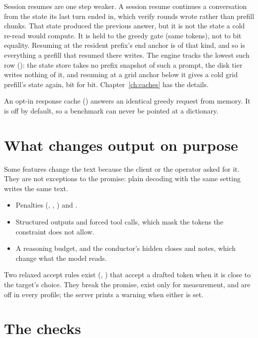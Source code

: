 Session resumes are one step weaker. A session resume continues a conversation from the state its last turn ended in, which verify rounds wrote rather than prefill chunks. That state produced the previous answer, but it is not the state a cold re-read would compute. It is held to the greedy gate (same tokens), not to bit equality. Resuming at the resident prefix's end anchor is of that kind, and so is everything a prefill that resumed there writes. The engine tracks the lowest such row (): the state store takes no prefix snapshot of such a prompt, the disk tier writes nothing of it, and resuming at a grid anchor below it gives a cold grid prefill's state again, bit for bit. Chapter~\ref{ch:caches} has the details.

An opt-in response cache () answers an identical greedy request from memory. It is off by default, so a benchmark can never be pointed at a dictionary.

\section{What changes output on purpose}

Some features change the text because the client or the operator asked for it. They are not exceptions to the promise: plain decoding with the same setting writes the same text.

\begin{itemize}
\item Penalties (, , ) and .
\item Structured outputs and forced tool calls, which mask the tokens the constraint does not allow.
\item A reasoning budget, and the conductor's hidden closes and notes, which change what the model reads.
\end{itemize}

Two relaxed accept rules exist (, ) that accept a drafted token when it is close to the target's choice. They break the promise, exist only for measurement, and are off in every profile; the server prints a warning when either is set.

\section{The checks}

